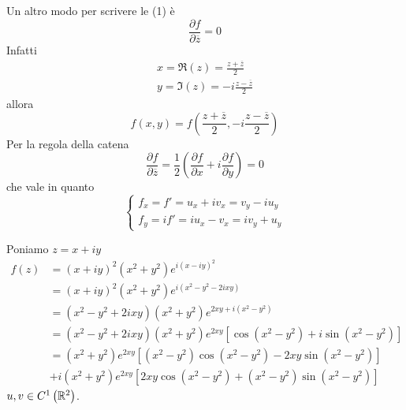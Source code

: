 \begin{rem}
Un altro modo per scrivere le (1) è
\begin{equation*}
\frac{\partial f}{\partial \overline{z}} = 0
\end{equation*}
Infatti
\begin{equation*}
\begin{array}{l}
x = \Re (z) = \frac{z + \overline{z}}{2}\\
y = \Im (z) = - i\frac{z - \overline{z}}{2}
\end{array}
\end{equation*}
allora
\begin{equation*}
f\left(x, y\right) = f\left(\frac{z + \overline{z}}{2}, - i\frac{z - \overline{z}}{2}\right)
\end{equation*}
Per la regola della catena
\begin{equation*}
\frac{\partial f}{\partial \overline{z}} = \frac{1}{2}\left(\frac{\partial f}{\partial x} + i\frac{\partial f}{\partial y}\right) = 0
\end{equation*}
che vale in quanto
\begin{equation*}
\begin{cases}
f_{x} = f' = u_{x} + iv_{x} = v_{y} - iu_{y}\\
f_{y} = if' = iu_{x} - v_{x} = iv_{y} + u_{y}
\end{cases}
\end{equation*}
\end{rem}
Poniamo $z = x + iy$
\begin{align*}
f(z) & = \left(x + iy\right)^{2}\left(x^{2} + y^{2}\right) e^{i\left(x - iy\right)^{2}}\\
 & = \left(x + iy\right)^{2}\left(x^{2} + y^{2}\right) e^{i\left(x^{2} - y^{2} - 2ixy\right)}\\
 & = \left(x^{2} - y^{2} + 2ixy\right)\left(x^{2} + y^{2}\right) e^{2xy + i\left(x^{2} - y^{2}\right)}\\
 & = \left(x^{2} - y^{2} + 2ixy\right)\left(x^{2} + y^{2}\right) e^{2xy}\left[\cos\left(x^{2} - y^{2}\right) + i\sin\left(x^{2} - y^{2}\right)\right]\\
 & = \left(x^{2} + y^{2}\right) e^{2xy}\left[\left(x^{2} - y^{2}\right)\cos\left(x^{2} - y^{2}\right) - 2xy\sin\left(x^{2} - y^{2}\right)\right]\\
 & + i\left(x^{2} + y^{2}\right) e^{2xy}\left[ 2xy\cos\left(x^{2} - y^{2}\right) + \left(x^{2} - y^{2}\right)\sin\left(x^{2} - y^{2}\right)\right]
\end{align*}
$u, v\in C^{1}\left(\mathbb{R}^{2}\right)$.

